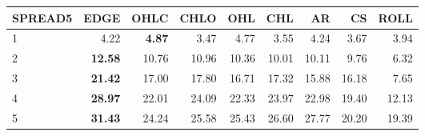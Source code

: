 \begin{table}[ht]
\centering
\begin{tabular}{lrrrrrrrr}
  \hline
SPREAD5 & EDGE & OHLC & CHLO & OHL & CHL & AR & CS & ROLL \\ 
  \hline
1 & 4.22 & \textbf{4.87} & 3.47 & 4.77 & 3.55 & 4.24 & 3.67 & 3.94 \\ 
  2 & \textbf{12.58} & 10.76 & 10.96 & 10.36 & 10.01 & 10.11 & 9.76 & 6.32 \\ 
  3 & \textbf{21.42} & 17.00 & 17.80 & 16.71 & 17.32 & 15.88 & 16.18 & 7.65 \\ 
  4 & \textbf{28.97} & 22.01 & 24.09 & 22.33 & 23.97 & 22.98 & 19.40 & 12.13 \\ 
  5 & \textbf{31.43} & 24.24 & 25.58 & 25.43 & 26.60 & 27.77 & 20.20 & 19.39 \\ 
   \hline
\end{tabular}
\end{table}
